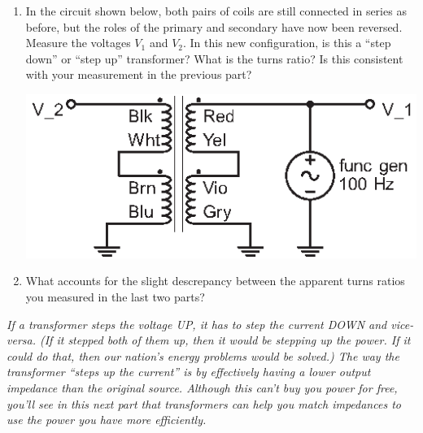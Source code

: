 \begin{enumerate}[wide]
\item In the circuit shown below, both pairs of coils are still connected in series as before, but the roles of the primary and secondary have now been reversed.  Measure the voltages $V_1$ and $V_2$.  In this new configuration, is this a ``step down'' or ``step up'' transformer?  What is the turns ratio?  Is this consistent with your measurement in the previous part? 

\begin{center}
\includegraphics{transformers/transformer_ser_ser_inverted.eps}
\end{center}

\item What accounts for the slight descrepancy between the apparent turns ratios you measured in the last two parts?


\end{enumerate}

\textit{If a transformer steps the voltage UP, it has to step the current DOWN and vice-versa.  (If it stepped both of them up, then it would be stepping up the power.  If it could do that, then our nation's energy problems would be solved.)  The way the transformer ``steps up the current'' is by effectively having a lower output impedance than the original source.  Although this can't buy you power for free, you'll see in this next part that transformers can help you match impedances to use the power you have more efficiently.}

